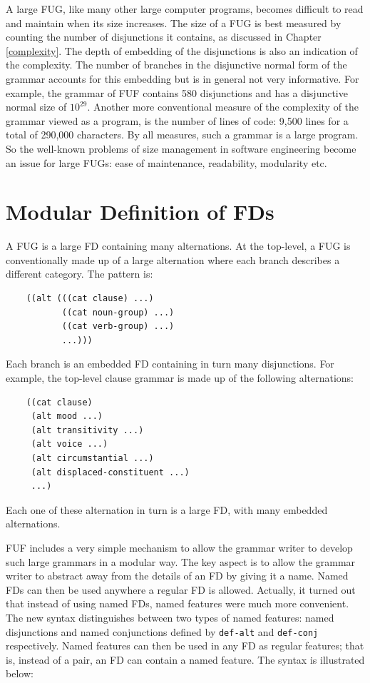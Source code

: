 \documentclass[10pt,a4paper]{report}
\begin{document}
A large \textsc{FUG}, like many other large computer programs, becomes difficult
to read and maintain when its size increases.  The size of a \textsc{FUG} is
best measured by counting the number of disjunctions it contains, as
discussed in Chapter \ref{complexity}.  
The depth of embedding of the disjunctions is also an indication of the
complexity.  The number of branches in the disjunctive normal form of the
grammar accounts for this embedding but is in general not very informative.
For example, the grammar of FUF contains 580 disjunctions and has a
disjunctive normal size of $10^{29}$.  Another more conventional measure of
the complexity of the grammar viewed as a program, is the number of lines
of code: 9,500 lines for a total of 290,000 characters.  By all measures,
such a grammar is a large program.  So the well-known problems of size
management in software engineering become an issue for large \textsc{FUG}s: ease
of maintenance, readability, modularity etc.

\section{Modular Definition of FDs}

A \textsc{FUG} is a large FD containing many alternations.  At the top-level, a
\textsc{FUG} is conventionally made up of a large alternation where each branch
describes a different category.  The pattern is:
\begin{lstlisting}
	((alt (((cat clause) ...)
	       ((cat noun-group) ...)
	       ((cat verb-group) ...)
	       ...)))
\end{lstlisting}

Each branch is an embedded FD containing in turn many disjunctions.  For
example, the top-level clause grammar is made up of the following
alternations:
\begin{lstlisting}
	((cat clause)
	 (alt mood ...)
	 (alt transitivity ...)
	 (alt voice ...)
	 (alt circumstantial ...)
	 (alt displaced-constituent ...)
	 ...)
\end{lstlisting}
Each one of these alternation in turn is a large FD, with many embedded
alternations.  

FUF includes a very simple mechanism to allow the grammar writer to develop
such large grammars in a modular way.  The key aspect is to allow the
grammar writer to abstract away from the details of an FD by giving it a
name.  Named FDs can then be used anywhere a regular FD is allowed.
Actually, it turned out that instead of using named FDs, named features
were much more convenient.  The new syntax distinguishes between two types
of named features: named disjunctions and named conjunctions defined by
{\tt def-alt} and {\tt def-conj} respectively.  Named features can then be used
in any FD as regular features; that is, instead of a pair, an FD can
contain a named feature.  The syntax is illustrated below:
\end{document}
